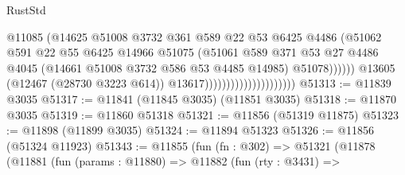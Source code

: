 \begin{lexlean}{RustStd}
\begin{coremodule}
                                                    @11085
                                                    (@14625
                                                      @51008
                                                      @3732
                                                      @361
                                                      @589
                                                      @22
                                                      @53
                                                      @6425
                                                      @4486
                                                      (@51062
                                                        @591
                                                        @22
                                                        @55
                                                        @6425
                                                        @14966
                                                        @51075
                                                        (@51061
                                                          @589
                                                          @371
                                                          @53
                                                          @27
                                                          @4486
                                                          @4045
                                                          (@14661
                                                            @51008
                                                            @3732
                                                            @586
                                                            @53
                                                            @4485
                                                            @14985)
                                                          @51078))))))
                                              @13605
                                              (@12467 (@28730 @3223 @614))
                                              @13617)))))))))))))))))))))
@51313 := @11839 @3035
@51317 := @11841 (@11845 @3035) (@11851 @3035)
@51318 := @11870 @3035
@51319 := @11860 @51318
@51321 := @11856 (@51319 @11875)
@51323 := @11898 (@11899 @3035)
@51324 := @11894 @51323
@51326 := @11856 (@51324 @11923)
@51343 := @11855
    (fun (fn : @302) =>
    @51321
      (@11878
        (@11881
          (fun (params : @11880) =>
          @11882
            (fun (rty : @3431) =>

\end{coremodule}
\end{lexlean}
